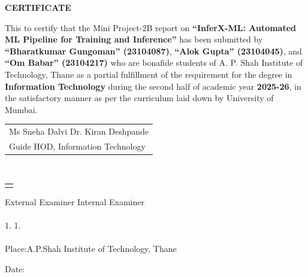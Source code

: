 
\newpage
{}

\thispagestyle{empty}
\begin{center}
 \large\textbf{CERTIFICATE}
\end{center}
\vspace{1cm}

\par This to certify that the Mini Project-2B report on \textbf{``InferX-ML: Automated ML Pipeline for Training and Inference''} has been submitted by \textbf{``Bharatkumar Gungoman'' (23104087)}, \textbf{``Alok Gupta'' (23104045)}, and \textbf{``Om Babar'' (23104217)} who are bonafide students of A. P. Shah Institute of Technology, Thane as a partial fulfillment of the requirement for the degree in \textbf{Information Technology} during the second half of academic year \textbf{2025-26}, in the satisfactory manner as per the curriculum laid down by University of Mumbai.

\vspace{25mm}
\begin{tabular}{@{}l@{}}
Ms Sneha Dalvi\hspace{69mm}       Dr. Kiran Deshpande\\
Guide \hspace{94mm}      HOD, Information Technology\\

\end{tabular}
\vspace{30mm}\\
\hfill
\begin{tabular}{@{}l@{}}

\vspace{5mm}
\end{tabular}


\vspace{15mm}
External Examiner\hspace{60mm}       Internal Examiner\\
\\1. \vspace{10mm} \hspace{90mm}       1.\\
\\

\vspace{1mm}
Place:A.P.Shah Institute of Technology, Thane\par
\vspace{1mm}

Date:
\clearpage

\vspace{5mm}

